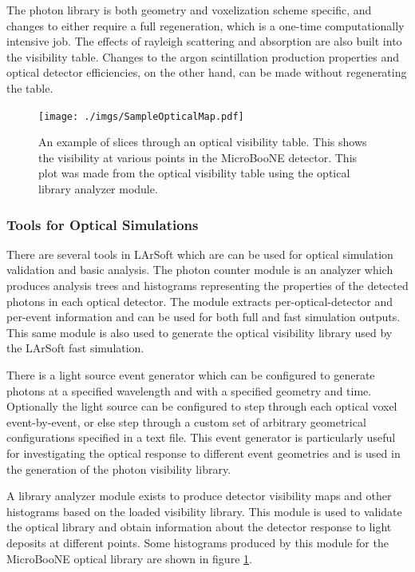 \documentclass[12pt]{elsarticle}
\begin{document}
The photon library is both geometry and voxelization scheme specific, and changes to either require a full regeneration, which is a one-time computationally intensive job.  The effects of rayleigh scattering and absorption are also built into the visibility table.  Changes to the argon scintillation production properties and optical detector efficiencies, on the other hand, can be made without regenerating the table.

\begin{figure}[t]
\centering
\caption{An example of slices through an optical visibility table. This shows the visibility at various points
in the MicroBooNE detector.  This plot was made from the optical visibility table using the optical library
analyzer module.}
\texttt{[image: ./imgs/SampleOpticalMap.pdf]}
\label{fig:opticalmap}
\end{figure}

\subsubsection{Tools for Optical Simulations}

There are several tools in LArSoft which are can be used for optical simulation validation and basic analysis.  The photon counter module is an analyzer which produces analysis trees and histograms representing the properties of the detected photons in each optical detector.  The module extracts per-optical-detector and per-event information and can be used for both full and fast simulation outputs.  This same module is also used to generate the optical visibility library used by the LArSoft fast simulation.

There is a light source event generator which can be configured to generate photons at a specified wavelength and with a specified geometry and time.  Optionally the light source can be configured to step through each optical voxel event-by-event, or else step through a custom set of arbitrary geometrical configurations specified in a text file.  This event generator is particularly useful for investigating the optical response to different event geometries and is used in the generation of the photon visibility library.

A library analyzer module exists to produce detector visibility maps and other histograms based on the loaded visibility library.  This module is used to validate the optical library and obtain information about the detector response to light deposits at different points.  Some histograms produced by this module for the MicroBooNE optical library are shown in figure \ref{fig:opticalmap}.
\end{document}
